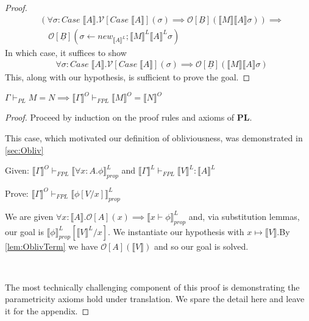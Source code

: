 \documentclass[acmsmall]{acmart}
\newcommand{\den}[1]{\llbracket #1\rrbracket}
\newcommand{\pl}{$\mathbf{PL}$}
\begin{document}
\begin{proof}
\begin{minipage}{0.9\linewidth}
\begin{align*}
  &(\forall \sigma : Case\;\den{A}. \mathcal{V}[Case\;\den{A}](\sigma) \implies \mathcal{O}[\underline{B}](\den{M}\den{A}\sigma)) \implies\\
  &\quad\mathcal{O}[\underline{B}](\sigma \leftarrow new_{\den{A}^L};\den{M}^L\den{A}^L\sigma)
\end{align*}
In which case, it suffices to show
\begin{align*}
  &\forall \sigma : Case\;\den{A}. \mathcal{V}[Case\;\den{A}](\sigma) \implies \mathcal{O}[\underline{B}](\den{M}\den{A}\sigma)
\end{align*}
This, along with our hypothesis, is sufficient to prove the goal.
\end{minipage}

\end{proof}
\begin{theorem}
  \label{thm:OblivTranslation} 
$\Gamma \vdash_{PL} M = N \implies \den{\Gamma}^{O}\vdash_{FPL} \den{M}^{O} = \den{N}^{O} $
\end{theorem}
\begin{proof}
 Proceed by induction on the proof rules and axioms of \pl. 

 \Case{$\eta\forall$}\quad This case, which motivated our definition of obliviousness, was demonstrated in \cref{sec:Obliv}
 \\
 \quad \begin{minipage}{0.9\linewidth}

 Given: $\den{\Gamma}^O \vdash_{FPL} \den{\forall x:A. \phi}^L_{prop}$ and $\den{\Gamma}^L \vdash_{FPL} \den{V}^L : \den{A}^L$

 Prove: $\den{\Gamma}^O \vdash_{FPL} \den{\phi[V/x]}^L_{prop}$

 \quad We are given $\forall x : \den{A}.\mathcal{O}[A](x) \implies \den{x \vdash \phi}^L_{prop}$ and, via substitution lemmas, our goal is $\den{\phi}^L_{prop}[\den{V}^L/x]$. We instantiate our hypothesis with $x \mapsto \den{V}$.By \cref{lem:OblivTerm} we have $\mathcal{O}[A](\den{V})$ and so our goal is solved.
 \end{minipage}
\\
 \quad \begin{minipage}{0.9\linewidth}
  The most technically challenging component of this proof is demonstrating the parametricity axioms hold under translation. We spare the detail here and leave it for the appendix.
 \end{minipage}


\end{proof}
\end{document}
